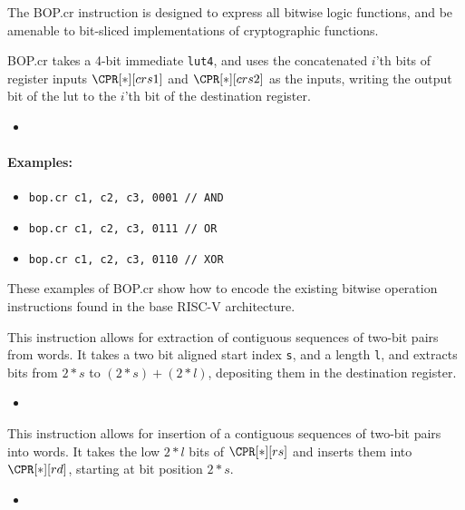 {\iencbopcr}
{
The BOP.cr instruction is designed to express all bitwise logic functions, and be
amenable to bit-sliced implementations of cryptographic functions.

BOP.cr takes a 4-bit immediate {\tt lut4}, and uses the concatenated
$i$'th bits of register inputs $\CPR[*][crs1]$ and  $\CPR[*][crs2]$
as the inputs, writing the output bit of the lut to the $i$'th bit of the
destination register.

}{
\begin{itemize}
\item {}
\end{itemize}
}{
\paragraph{Examples:}
\begin{itemize}
\item {\tt bop.cr  c1, c2, c3, 0001    // AND}
\item {\tt bop.cr  c1, c2, c3, 0111    // OR }
\item {\tt bop.cr  c1, c2, c3, 0110    // XOR}
\end{itemize}
These examples of BOP.cr show how to encode the existing
bitwise operation instructions found in the base RISC-V architecture.
}

{\iencextcr}
{
This instruction allows for extraction of contiguous sequences of two-bit
pairs from words.
It takes a two bit aligned start index {\tt s}, and a length
{\tt l}, and extracts bits from $2*s$ to $(2*s)+(2*l)$, depositing them in
the destination register.
}{
\begin{itemize}
\item {}
\end{itemize}
}{}


{\iencinscr}
{
This instruction allows for insertion of a contiguous sequences of two-bit
pairs into words.
It takes the low $2*l$ bits of $\CPR[*][rs]$ and inserts them
into $\CPR[*][rd]$, starting at bit position $2*s$.
}{
\begin{itemize}
\item {}
\end{itemize}
}{}

